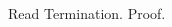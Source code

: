 \begin{frame}{Read Termination. Proof.}
\begin{columns}[T]
\begin{column}{.5\textwidth}
        \end{column}
    \end{columns}
\end{frame}


